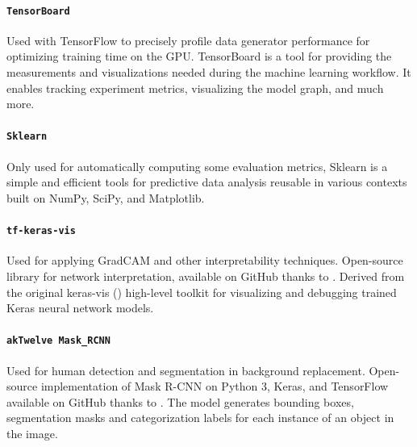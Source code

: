 \paragraph*{\texttt{TensorBoard}}
Used with TensorFlow to precisely profile data generator performance for optimizing training time on the GPU. TensorBoard is a tool for providing the measurements and visualizations needed during the machine learning workflow. It enables tracking experiment metrics, visualizing the model graph, and much more.

\paragraph*{\texttt{Sklearn}}
Only used for automatically computing some evaluation metrics, Sklearn is a simple and efficient tools for predictive data analysis reusable in various contexts built on NumPy, SciPy, and Matplotlib.

\paragraph*{\texttt{tf-keras-vis}}
Used for applying GradCAM and other interpretability techniques. Open-source library for network interpretation, available on GitHub thanks to \cite{tf-keras-vis}. Derived from the original keras-vis (\cite{keras-vis}) high-level toolkit for visualizing and debugging trained Keras neural network models.

\paragraph*{\texttt{akTwelve Mask\_RCNN}}
Used for human detection and segmentation in background replacement. Open-source implementation of Mask R-CNN on Python 3, Keras, and TensorFlow available on GitHub thanks to \cite{MaskRCNN_akTwelve}. The model generates bounding boxes, segmentation masks and categorization labels for each instance of an object in the image.







